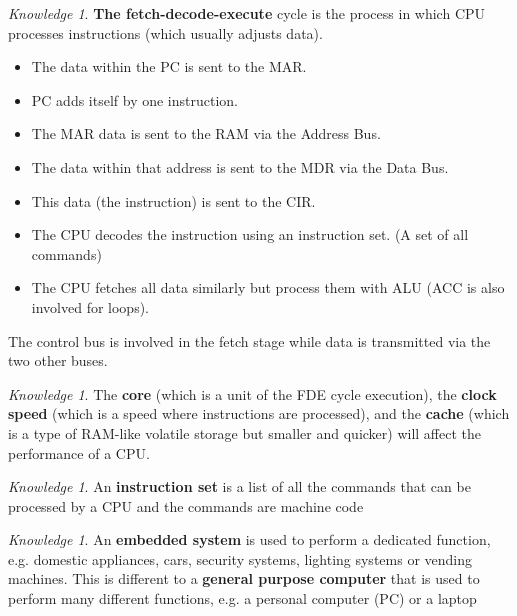 \documentclass[8pt]{article}
\theoremstyle{remark}
\newtheorem{knowledge}[method]{Knowledge}
\begin{document}
            \begin{knowledge}
                \textbf{The fetch-decode-execute} cycle is the process in which CPU processes instructions (which usually adjusts data).

                \begin{itemize}
                    \item The data within the PC is sent to the MAR.
                    \item PC adds itself by one instruction.
                    \item The MAR data is sent to the RAM via the Address Bus.
                    \item The data within that address is sent to the MDR via the Data Bus.
                    \item This data (the instruction) is sent to the CIR.
                    \item The CPU decodes the instruction using an instruction set. (A set of all commands)
                    \item The CPU fetches all data similarly but process them with ALU (ACC is also involved for loops).
                \end{itemize}

                The control bus is involved in the fetch stage while data is transmitted via the two other buses.
            \end{knowledge}

            \begin{knowledge}
                The \textbf{core} (which is a unit of the FDE cycle execution), the \textbf{clock speed} (which is a speed where instructions are processed), and the \textbf{cache} (which is a type of RAM-like volatile storage but smaller and quicker) will affect the performance of a CPU.
            \end{knowledge}

            \begin{knowledge}
                An \textbf{instruction set} is a list of all the commands that can be processed by a CPU and the commands are machine code
            \end{knowledge}

            \begin{knowledge}
                An \textbf{embedded system} is used to perform a dedicated function, e.g. domestic appliances, cars, security systems, lighting systems or vending machines. This is different to a \textbf{general purpose computer} that is used to perform many different functions, e.g. a personal computer (PC) or a laptop
            \end{knowledge}
\end{document}
